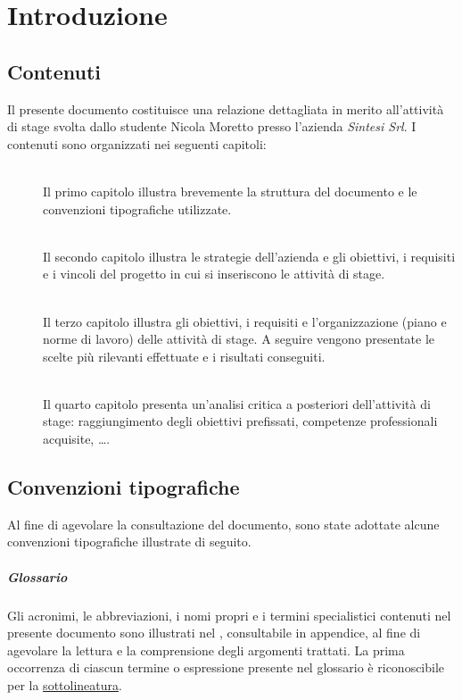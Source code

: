 \chapter{Introduzione}
\label{ch:tesi:intro}

\section{Contenuti}
Il presente documento costituisce una relazione dettagliata in merito all'attività di stage svolta dallo studente Nicola Moretto presso l'azienda \textit{Sintesi Srl}. I contenuti sono organizzati nei seguenti capitoli:
\begin{description}
  \item[] \hfill \\
  Il primo capitolo illustra brevemente la struttura del documento e le convenzioni tipografiche utilizzate.
  \item[] \hfill \\
  Il secondo capitolo illustra le strategie dell'azienda e gli obiettivi, i requisiti e i vincoli del progetto in cui si inseriscono le attività di stage.
  \item[] \hfill \\ 
	Il terzo capitolo illustra gli obiettivi, i requisiti e l'organizzazione (piano e norme di lavoro) delle attività di stage. A seguire vengono presentate le scelte più rilevanti effettuate e i risultati conseguiti.
  \item[] \hfill \\
	Il quarto capitolo presenta un'analisi critica a posteriori dell'attività di stage: raggiungimento degli obiettivi prefissati, competenze professionali acquisite, \ldots.
\end{description}

\section{Convenzioni tipografiche}
Al fine di agevolare la consultazione del documento, sono state adottate alcune convenzioni tipografiche illustrate di seguito.

\paragraph{Glossario} Gli acronimi, le abbreviazioni, i nomi propri e i termini specialistici contenuti nel presente documento sono illustrati nel \textit{}, consultabile in appendice, al fine di agevolare la lettura e la comprensione degli argomenti trattati.	La prima occorrenza di ciascun termine o espressione presente nel glossario è riconoscibile per la \underline{sottolineatura}.

